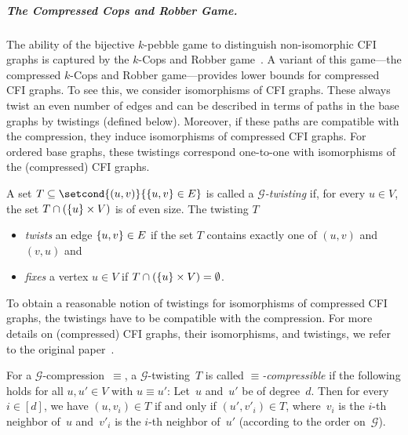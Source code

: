 \documentclass[a4paper,english, thm-restate]{lipics-v2021}
\newcommand{\defining}[1]{\emph{#1}}
\DeclarePairedDelimiter\set{\lbrace}{\rbrace}
\newcommand{\comp}{\equiv}
\newcommand{\graphG}{\mathcal{G}}
\begin{document}
\subparagraph*{The Compressed Cops and Robber Game.}

The ability of the bijective $k$-pebble game
to distinguish non-isomorphic CFI graphs
is captured by the $k$-Cops and Robber game~\cite{SeymourThomas93, DBLP:conf/focs/GroheLNS23}.
A variant of this game---the compressed $k$-Cops and Robber game---provides lower bounds for compressed CFI graphs.
To see this, we consider isomorphisms of CFI graphs. These always twist an even number of edges and can be described 
in terms of paths in the base graphs by twistings (defined below). Moreover, if these paths are compatible with the compression, they induce isomorphisms of  compressed CFI graphs.
For ordered base graphs, these twistings correspond one-to-one with isomorphisms of the (compressed) CFI graphs.

\begin{definition}[Twisting]
        A set $T \subseteq \setcond{(u,v)}{\set{u,v} \in E}$
        is called a \defining{$\graphG$-twisting}
        if, for every $u \in V$, the set $T \cap (\set{u} \times V)$
        is of even size.
        The twisting $T$
        \begin{itemize}
                \item \defining{twists} an edge $\set{u,v} \in E$
                if the set $T$
                contains exactly one of $(u,v)$ and $(v,u)$ and
                \item \defining{fixes} a vertex $u \in V$ if $T \cap (\set{u} \times V) = \emptyset$.
        \end{itemize}
%
%
%
\end{definition}

\noindent To obtain a reasonable notion of twistings for isomorphisms of  compressed CFI graphs,
the twistings have to be compatible with the compression.
For more details on (compressed) CFI graphs, their isomorphisms, and twistings,
we refer to the original paper~\cite{DBLP:conf/focs/GroheLNS23}.

\begin{definition}
        For a $\graphG$-compression~$\comp$,
        a $\graphG$-twisting~$T$ is called \linebreak \defining{$\comp$\nobreakdash-compressible} if the following holds for all $u,u' \in V$ with $u \comp u'$:
        Let~$u$ and~$u'$ be of degree~$d$.
        Then for every $i\in[d]$, we have
        $(u,v_i) \in T$ if and only if $(u',v'_i) \in T$,
        where~$v_i$ is the $i$-th neighbor of~$u$ and~$v'_i$ is the $i$-th neighbor of~$u'$ (according to the order on~$\graphG$).
\end{definition}
\end{document}
